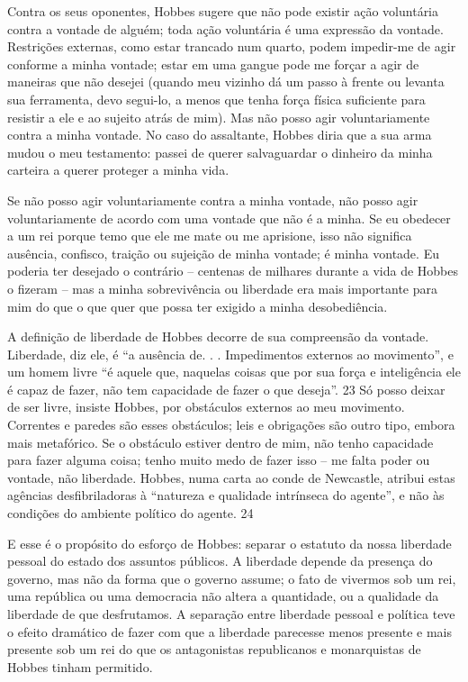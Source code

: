 \par
 
Contra os seus oponentes, Hobbes sugere que não pode existir ação voluntária contra a vontade de alguém; toda ação voluntária é uma expressão da vontade. Restrições externas, como estar trancado num quarto, podem impedir-me de agir conforme a minha vontade; estar em uma gangue pode me forçar a agir de maneiras que não desejei (quando meu vizinho dá um passo à frente ou levanta sua ferramenta, devo segui-lo, a menos que tenha força física suficiente para resistir a ele e ao sujeito atrás de mim). Mas não posso agir voluntariamente contra a minha vontade. No caso do assaltante, Hobbes diria que a sua arma mudou o meu testamento: passei de querer salvaguardar o dinheiro da minha carteira a querer proteger a minha vida.
 
\par
 
Se não posso agir voluntariamente contra a minha vontade, não posso agir voluntariamente de acordo com uma vontade que não é a minha. Se eu obedecer a um rei porque temo que ele me mate ou me aprisione, isso não significa ausência, confisco, traição ou sujeição de minha vontade; é minha vontade. Eu poderia ter desejado o contrário – centenas de milhares durante a vida de Hobbes o fizeram – mas a minha sobrevivência ou liberdade era mais importante para mim do que o que quer que possa ter exigido a minha desobediência.
 
\par
 
A definição de liberdade de Hobbes decorre de sua compreensão da vontade. Liberdade, diz ele, é “a ausência de. . . Impedimentos externos ao movimento”, e um homem livre “é aquele que, naquelas coisas que por sua força e inteligência ele é capaz de fazer, não tem capacidade de fazer o que deseja”.
 {\color{blue} 23}  
Só posso deixar de ser livre, insiste Hobbes, por obstáculos externos ao meu movimento. Correntes e paredes são esses obstáculos; leis e obrigações são outro tipo, embora mais metafórico. Se o obstáculo estiver dentro de mim, não tenho capacidade para fazer alguma coisa; tenho muito medo de fazer isso – me falta poder ou vontade, não liberdade. Hobbes, numa carta ao conde de Newcastle, atribui estas agências desfibriladoras à “natureza e qualidade intrínseca do agente”, e não às condições do ambiente político do agente.
 {\color{blue} 24}  

 
\par
 
E esse é o propósito do esforço de Hobbes: separar o estatuto da nossa liberdade pessoal do estado dos assuntos públicos. A liberdade depende da presença do governo, mas não da forma que o governo assume; o fato de vivermos sob um rei, uma república ou uma democracia não altera a quantidade, ou a qualidade da liberdade de que desfrutamos. A separação entre liberdade pessoal e política teve o efeito dramático de fazer com que a liberdade parecesse menos presente e mais presente sob um rei do que os antagonistas republicanos e monarquistas de Hobbes tinham permitido.
 
